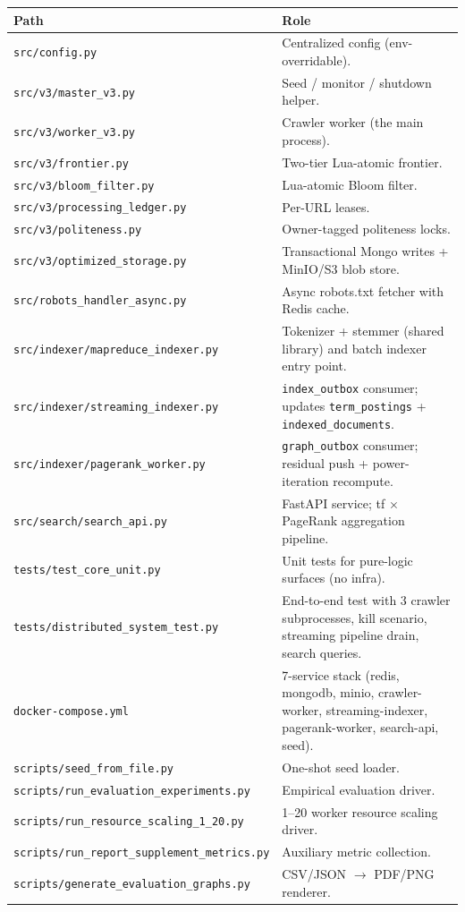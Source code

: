 \documentclass[11pt,a4paper]{article}
\newcommand{\code}[1]{\texttt{#1}}
\begin{document}
\begin{table}[H]
\centering
\small
\begin{tabular}{p{}p{}}
\toprule
Path & Role \\
\midrule
\code{src/config.py} & Centralized config (env-overridable).\\
\code{src/v3/master\_v3.py} & Seed / monitor / shutdown helper.\\
\code{src/v3/worker\_v3.py} & Crawler worker (the main process).\\
\code{src/v3/frontier.py} & Two-tier Lua-atomic frontier.\\
\code{src/v3/bloom\_filter.py} & Lua-atomic Bloom filter.\\
\code{src/v3/processing\_ledger.py} & Per-URL leases.\\
\code{src/v3/politeness.py} & Owner-tagged politeness locks.\\
\code{src/v3/optimized\_storage.py} & Transactional Mongo writes + MinIO/S3 blob store.\\
\code{src/robots\_handler\_async.py} & Async robots.txt fetcher with Redis cache.\\
\code{src/indexer/mapreduce\_indexer.py} & Tokenizer + stemmer (shared library) and batch indexer entry point.\\
\code{src/indexer/streaming\_indexer.py} & \code{index\_outbox} consumer; updates \code{term\_postings} + \code{indexed\_documents}.\\
\code{src/indexer/pagerank\_worker.py} & \code{graph\_outbox} consumer; residual push + power-iteration recompute.\\
\code{src/search/search\_api.py} & FastAPI service; tf $\times$ PageRank aggregation pipeline.\\
\code{tests/test\_core\_unit.py} & Unit tests for pure-logic surfaces (no infra).\\
\code{tests/distributed\_system\_test.py} & End-to-end test with 3 crawler subprocesses, kill scenario, streaming pipeline drain, search queries.\\
\code{docker-compose.yml} & 7-service stack (redis, mongodb, minio, crawler-worker, streaming-indexer, pagerank-worker, search-api, seed).\\
\code{scripts/seed\_from\_file.py} & One-shot seed loader.\\
\code{scripts/run\_evaluation\_experiments.py} & Empirical evaluation driver.\\
\code{scripts/run\_resource\_scaling\_1\_20.py} & 1--20 worker resource scaling driver.\\
\code{scripts/run\_report\_supplement\_metrics.py} & Auxiliary metric collection.\\
\code{scripts/generate\_evaluation\_graphs.py} & CSV/JSON $\to$ PDF/PNG renderer.\\
\bottomrule
\end{tabular}
\normalsize
\end{table}
\end{document}
